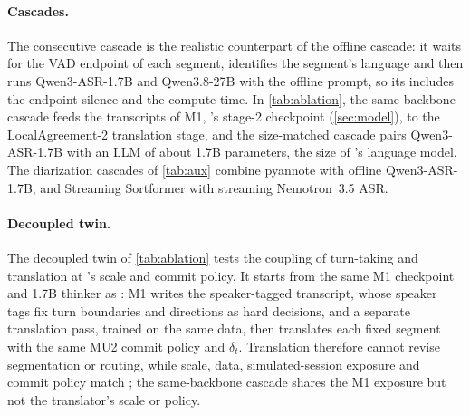\paragraph{Cascades.}
The consecutive cascade is the realistic counterpart of the offline cascade: it waits for the VAD endpoint of each segment, identifies the segment's language and then runs Qwen3-ASR-1.7B and Qwen3.8-27B with the offline prompt, so its \eo includes the endpoint silence and the compute time. In \cref{tab:ablation}, the same-backbone cascade feeds the transcripts of M1, \model's stage-2 checkpoint (\cref{sec:model}), to the LocalAgreement-2 translation stage, and the size-matched cascade pairs Qwen3-ASR-1.7B with an LLM of about 1.7B parameters, the size of \model's language model. The diarization cascades of \cref{tab:aux} combine pyannote \citep{bredin2023pyannote} with offline Qwen3-ASR-1.7B, and Streaming Sortformer \citep{medennikov2025streaming} with streaming Nemotron~3.5 ASR.

\paragraph{Decoupled twin.}
The decoupled twin of \cref{tab:ablation} tests the coupling of turn-taking and translation at \model's scale and commit policy. It starts from the same M1 checkpoint and 1.7B thinker as \model: M1 writes the speaker-tagged transcript, whose speaker tags fix turn boundaries and directions as hard decisions, and a separate translation pass, trained on the same data, then translates each fixed segment with the same MU2 commit policy and $\delta_t$. Translation therefore cannot revise segmentation or routing, while scale, data, simulated-session exposure and commit policy match \model; the same-backbone cascade shares the M1 exposure but not the translator's scale or policy.

